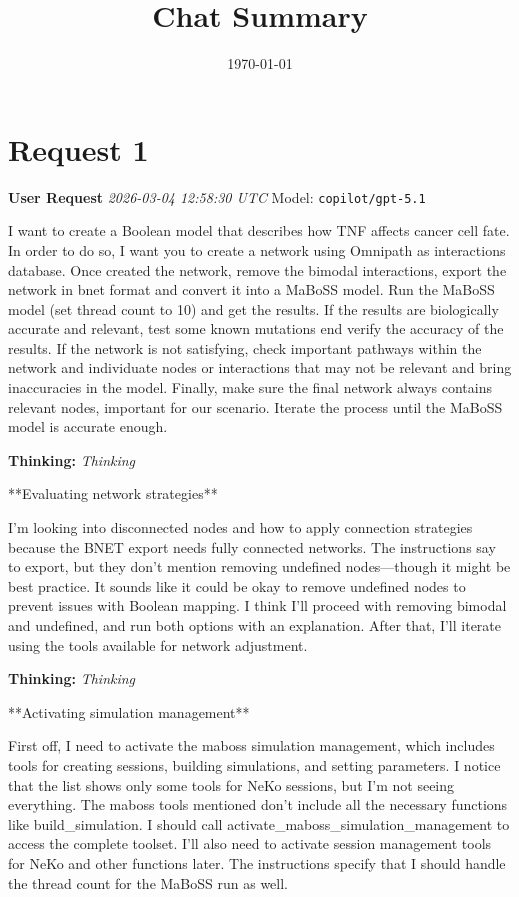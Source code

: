 \documentclass[11pt,a4paper]{article}
\title{Chat Summary}
\date{\today}
\begin{document}
\maketitle
\tableofcontents
\newpage

\section{Request 1}
\begin{userbox}
\textbf{User Request}
\quad \textit{2026-03-04 12:58:30 UTC}
\quad Model: \texttt{copilot/gpt-5.1}

I want to create a Boolean model that describes how TNF affects cancer cell fate. In order to do so, I want you to create a network using Omnipath as interactions database.
Once created the network, remove the bimodal interactions, export the network in bnet format and convert it into a MaBoSS model. Run the MaBoSS model (set thread count to 10) and get the results. If the results are biologically accurate and relevant, test some known mutations end verify the accuracy of the results. If the network is not satisfying, check important pathways within the network and individuate nodes or interactions that may not be relevant and bring inaccuracies in the model. Finally, make sure the final network always contains relevant nodes, important for our scenario.
Iterate the process until the MaBoSS model is accurate enough.

\end{userbox}
\begin{thinkbox}
\textbf{Thinking:} \textit{Thinking}

**Evaluating network strategies**

I’m looking into disconnected nodes and how to apply connection strategies because the BNET export needs fully connected networks. The instructions say to export, but they don’t mention removing undefined nodes—though it might be best practice. It sounds like it could be okay to remove undefined nodes to prevent issues with Boolean mapping. I think I’ll proceed with removing bimodal and undefined, and run both options with an explanation. After that, I’ll iterate using the tools available for network adjustment.

\end{thinkbox}
\begin{thinkbox}
\textbf{Thinking:} \textit{Thinking}

**Activating simulation management**

First off, I need to activate the maboss simulation management, which includes tools for creating sessions, building simulations, and setting parameters. I notice that the list shows only some tools for NeKo sessions, but I'm not seeing everything. The maboss tools mentioned don’t include all the necessary functions like build\_simulation. I should call activate\_maboss\_simulation\_management to access the complete toolset. I’ll also need to activate session management tools for NeKo and other functions later. The instructions specify that I should handle the thread count for the MaBoSS run as well.

\end{thinkbox}
\end{document}
